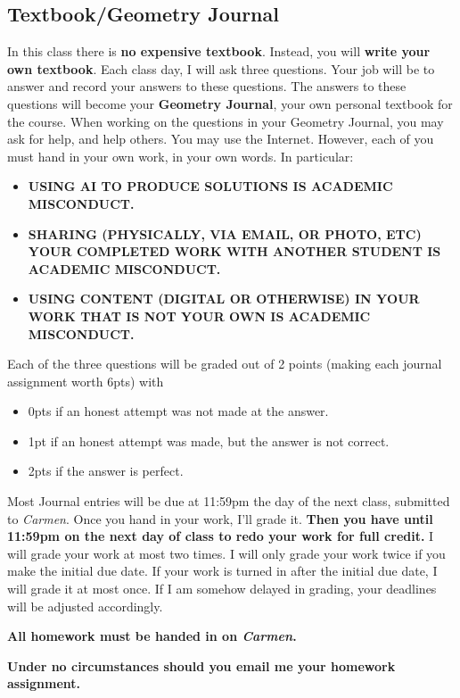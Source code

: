 \documentclass[12pt]{amsart}
\begin{document}
\subsection*{Textbook/Geometry Journal}
In this class there is \textbf{no expensive textbook}. Instead, you
will \textbf{write your own textbook}. Each class day, I will ask
three questions. Your job will be to answer and record your answers to
these questions. The answers to these questions will become your
\textbf{Geometry Journal}, your own personal textbook for the course.
When working on the questions in your Geometry Journal, you may ask
for help, and help others. You may use the Internet. However, each of
you must hand in your own work, in your own words.
In particular:
\begin{itemize}
  \item \textbf{USING AI TO PRODUCE SOLUTIONS IS
          ACADEMIC MISCONDUCT.}
  \item \textbf{SHARING (PHYSICALLY, VIA EMAIL, OR PHOTO, ETC) YOUR COMPLETED
          WORK WITH ANOTHER STUDENT IS
          ACADEMIC MISCONDUCT.}
  \item \textbf{USING CONTENT (DIGITAL OR OTHERWISE) IN YOUR WORK THAT IS NOT
          YOUR OWN
          IS ACADEMIC MISCONDUCT.}
\end{itemize}

Each of the three questions will be graded out of 2 points (making
each journal assignment worth 6pts) with
\begin{itemize}
  \item 0pts if an honest attempt was not made at the answer.
  \item 1pt if an honest attempt was made, but the answer is not correct.
  \item 2pts if the answer is perfect.
\end{itemize}

Most Journal entries will be due at 11:59pm the day of the next class,
submitted to \textit{Carmen}. Once you hand in your work, I'll grade
it. \textbf{Then you have until 11:59pm on the next day of class to
  redo your work for full credit.}  I will grade your work at most two
times. I will only grade your work twice if you make the initial due
date. If your work is turned in after the initial due date, I will
grade it at most once. If I am somehow delayed in grading, your
deadlines will be adjusted accordingly.
\begin{center}
  \textbf{All homework must be handed in on \textit{Carmen}.}
\end{center}
\begin{center}
  \textbf{Under no circumstances should you email me
    your homework assignment.}
\end{center}
\end{document}
